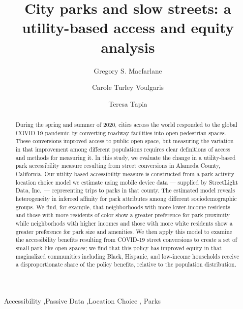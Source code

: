 \documentclass[3p, authoryear, review]{elsarticle} %
\begin{document}
\begin{frontmatter}

  \title{City parks and slow streets: a utility-based access and equity analysis}
    \author[BYU]{Gregory S. Macfarlane%
  }
    \author[Harvard]{Carole Turley Voulgaris%
  }
    \author[StreetLight]{Teresa Tapia%
  }
  
  \begin{abstract}
  During the spring and summer of 2020, cities across the world responded to the global COVID-19 pandemic by converting roadway facilities into open pedestrian spaces. These conversions improved access to public open space, but measuring the variation in that improvement among different populations requires clear definitions of access and methods for measuring it. In this study, we evaluate the change in a utility-based park accessibility measure resulting from street conversions in Alameda County, California. Our utility-based accessibility measure is constructed from a park activity location choice model we estimate using mobile device data --- supplied by StreetLight Data, Inc.~--- representing trips to parks in that county. The estimated model reveals heterogeneity in inferred affinity for park attributes among different sociodemographic groups. We find, for example, that neighborhoods with more lower-income residents and those with more residents of color show a greater preference for park proximity while neighborhods with higher incomes and those with more white residents show a greater preference for park size and amenities. We then apply this model to examine the accessibility benefits resulting from COVID-19 street conversions to create a set of small park-like open spaces; we find that this policy has improved equity in that maginalized communities including Black, Hispanic, and low-income households receive a disproportionate share of the policy benefits, relative to the population distribution.
  \end{abstract}
    \begin{keyword}
    Accessibility \sep Passive Data \sep Location Choice \sep 
    Parks
  \end{keyword}
  
 \end{frontmatter}
\end{document}
